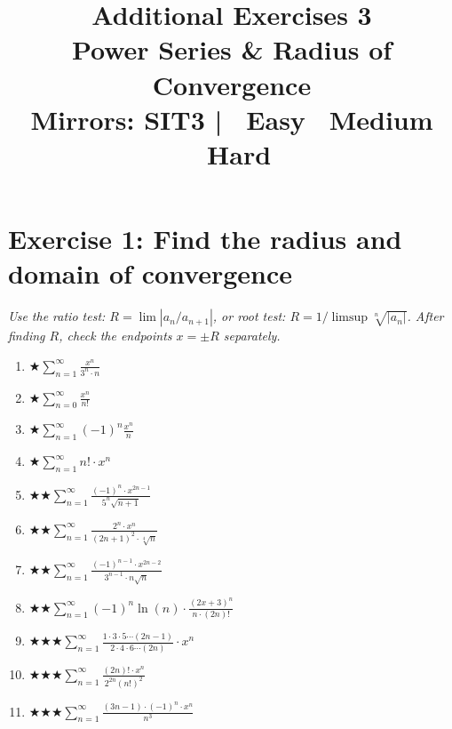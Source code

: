 \documentclass[12pt,a4paper]{article}
\title{\textbf{Additional Exercises 3}\\
\large Power Series \& Radius of Convergence\\[4pt]
\normalsize Mirrors: SIT3 \quad|\quad
\easy\ Easy \quad \medium\ Medium \quad \hard\ Hard}
\date{}
\newcommand{\easy}{{\color{green!60!black}$\bigstar$}}
\newcommand{\medium}{{\color{orange}$\bigstar\bigstar$}}
\newcommand{\hard}{{\color{red}$\bigstar\bigstar\bigstar$}}
\begin{document}
\maketitle
\thispagestyle{empty}

\section*{Exercise 1: Find the radius and domain of convergence}

\emph{Use the ratio test: $R = \lim |a_n/a_{n+1}|$, or root test: $R = 1/\limsup\sqrt[n]{|a_n|}$.
After finding $R$, check the endpoints $x = \pm R$ separately.}

\begin{enumerate}[leftmargin=*, label=(\alph*)]

\item \easy\quad $\displaystyle\sum_{n=1}^{\infty}\frac{x^n}{3^n \cdot n}$

\item \easy\quad $\displaystyle\sum_{n=0}^{\infty}\frac{x^n}{n!}$

\item \easy\quad $\displaystyle\sum_{n=1}^{\infty}(-1)^n\frac{x^n}{n}$

\item \easy\quad $\displaystyle\sum_{n=1}^{\infty}n!\cdot x^n$

\item \medium\quad $\displaystyle\sum_{n=1}^{\infty}\frac{(-1)^n\cdot x^{2n-1}}{5^n\sqrt{n+1}}$

\item \medium\quad $\displaystyle\sum_{n=1}^{\infty}\frac{2^n\cdot x^n}{(2n+1)^2\cdot\sqrt[4]{n}}$

\item \medium\quad $\displaystyle\sum_{n=1}^{\infty}\frac{(-1)^{n-1}\cdot x^{2n-2}}{3^{n-1}\cdot n\sqrt{n}}$

\item \medium\quad $\displaystyle\sum_{n=1}^{\infty}(-1)^n\ln(n)\cdot\frac{(2x+3)^n}{n\cdot(2n)!}$

\item \hard\quad $\displaystyle\sum_{n=1}^{\infty}\frac{1\cdot 3\cdot 5\cdots(2n-1)}{2\cdot 4\cdot 6\cdots(2n)}\cdot x^n$

\item \hard\quad $\displaystyle\sum_{n=1}^{\infty}\frac{(2n)!\cdot x^n}{2^{2n}(n!)^2}$

\item \hard\quad $\displaystyle\sum_{n=1}^{\infty}\frac{(3n-1)\cdot(-1)^n\cdot x^n}{n^3}$

\end{enumerate}
\end{document}
